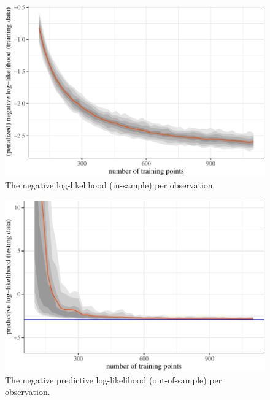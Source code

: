 \documentclass[11pt]{article}
\begin{document}
\begin{figure}[t]

{\centering \includegraphics{gfx/pen-negll-1} 

}

\caption{The negative log-likelihood (in-sample) per observation.}\label{fig:pen-negll}
\end{figure}

\begin{figure}[t]

{\centering \includegraphics{gfx/predict-negll-1} 

}

\caption{The negative predictive log-likelihood (out-of-sample) per observation.}\label{fig:predict-negll}
\end{figure}
\end{document}
